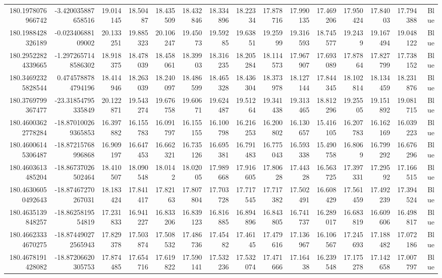 \begin{center}
\begin{longtable}{rrrrrrrrrrrrrrr}
180.1978076966742 & -3.420035887658516 & 19.014145 & 18.50487 & 18.435509 & 18.432846 & 18.334896 & 18.22334 & 17.878716 & 17.990135 & 17.469206 & 17.950424 & 17.84003 & 17.794388 & Blue \\
180.1988428326189 & -0.02340688109002 & 20.133251 & 19.885323 & 20.106247 & 19.45073 & 19.59285 & 19.63851 & 19.25999 & 19.316593 & 18.745577 & 19.2439 & 19.167494 & 19.048122 & Blue \\
180.29522824339665 & -1.2972657148586302 & 18.918375 & 18.478039 & 18.458061 & 18.39903 & 18.316235 & 18.205284 & 18.114573 & 17.967907 & 17.693089 & 17.87864 & 17.827799 & 17.738152 & Blue \\
180.34692325828544 & 0.4745788784794196 & 18.414946 & 18.263039 & 18.240097 & 18.486599 & 18.465328 & 18.436304 & 18.373978 & 18.127144 & 17.844345 & 18.102814 & 18.134459 & 18.231876 & Blue \\
180.3769799367477 & -23.31854795335849 & 20.122871 & 19.543274 & 19.676758 & 19.60671 & 19.624487 & 19.51264 & 19.341438 & 19.313465 & 18.812296 & 19.25505 & 19.151892 & 19.081715 & Blue \\
180.46003622778284 & -18.870100269365853 & 16.397882 & 16.155783 & 16.091797 & 16.155155 & 16.100798 & 16.216253 & 16.200802 & 16.130657 & 15.416105 & 16.207783 & 16.162169 & 16.039223 & Blue \\
180.46006145306487 & -18.87215768996868 & 16.909197 & 16.647453 & 16.662321 & 16.735126 & 16.695381 & 16.791483 & 16.775043 & 16.593338 & 15.490758 & 16.8069 & 16.799292 & 16.676296 & Blue \\
180.4603613485204 & -18.86737026502464 & 18.410507 & 18.090548 & 18.0142 & 18.02005 & 17.989668 & 17.916605 & 17.80628 & 17.44328 & 16.563725 & 17.397331 & 17.29592 & 17.166515 & Blue \\
180.46306050492643 & -18.87467270267031 & 18.183424 & 17.841417 & 17.82163 & 17.807804 & 17.703728 & 17.717545 & 17.717382 & 17.502491 & 16.608429 & 17.561459 & 17.492239 & 17.394524 & Blue \\
180.4635139848257 & -18.8625819554819 & 17.231833 & 16.941227 & 16.833206 & 16.839123 & 16.816885 & 16.894896 & 16.843805 & 16.741737 & 16.289017 & 16.683819 & 16.609606 & 16.498817 & Blue \\
180.46623334670275 & -18.874490272565943 & 17.829378 & 17.503874 & 17.508532 & 17.486736 & 17.45482 & 17.46145 & 17.479616 & 17.136967 & 16.106567 & 17.245693 & 17.188482 & 17.072186 & Blue \\
180.4678191428082 & -18.87206620305753 & 17.874485 & 17.654716 & 17.619822 & 17.590141 & 17.532236 & 17.532074 & 17.471666 & 17.16438 & 16.239548 & 17.175278 & 17.142658 & 17.007797 & Blue \\

\end{longtable}
\end{center}
